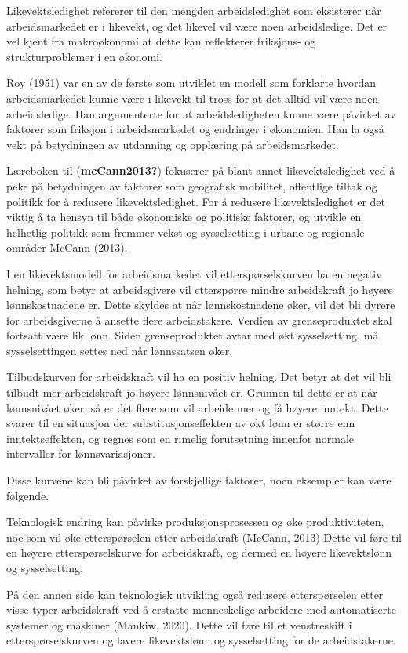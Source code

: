 \documentclass[
]{article}
\begin{document}
Likevektsledighet refererer til den mengden arbeidsledighet som
eksisterer når arbeidsmarkedet er i likevekt, og det likevel vil være
noen arbeidsledige. Det er vel kjent fra makroøkonomi at dette kan
reflekterer friksjons- og strukturproblemer i en økonomi.

Roy (1951) var en av de første som utviklet en modell som forklarte
hvordan arbeidsmarkedet kunne være i likevekt til tross for at det
alltid vil være noen arbeidsledige. Han argumenterte for at
arbeidsledigheten kunne være påvirket av faktorer som friksjon i
arbeidsmarkedet og endringer i økonomien. Han la også vekt på
betydningen av utdanning og opplæring på arbeidsmarkedet.

Læreboken til (\textbf{mcCann2013?}) fokuserer på blant annet
likevektsledighet ved å peke på betydningen av faktorer som geografisk
mobilitet, offentlige tiltak og politikk for å redusere
likevektsledighet. For å redusere likevektsledighet er det viktig å ta
hensyn til både økonomiske og politiske faktorer, og utvikle en
helhetlig politikk som fremmer vekst og sysselsetting i urbane og
regionale områder McCann (2013).

I en likevektsmodell for arbeidsmarkedet vil etterspørselskurven ha en
negativ helning, som betyr at arbeidsgivere vil etterspørre mindre
arbeidskraft jo høyere lønnskostnadene er. Dette skyldes at når
lønnskostnadene øker, vil det bli dyrere for arbeidsgiverne å ansette
flere arbeidstakere. Verdien av grenseproduktet skal fortsatt være lik
lønn. Siden grenseproduktet avtar med økt sysselsetting, må
sysselsettingen settes ned når lønnssatsen øker.

Tilbudskurven for arbeidskraft vil ha en positiv helning. Det betyr at
det vil bli tilbudt mer arbeidskraft jo høyere lønnsnivået er. Grunnen
til dette er at når lønnsnivået øker, så er det flere som vil arbeide
mer og få høyere inntekt. Dette svarer til en situasjon der
substitusjonseffekten av økt lønn er større enn inntektseffekten, og
regnes som en rimelig forutsetning innenfor normale intervaller for
lønnsvariasjoner.

Disse kurvene kan bli påvirket av forskjellige faktorer, noen eksempler
kan være følgende.

Teknologisk endring kan påvirke produksjonsprosessen og øke
produktiviteten, noe som vil øke etterspørselen etter arbeidskraft
(McCann, 2013) Dette vil føre til en høyere etterspørselskurve for
arbeidskraft, og dermed en høyere likevektslønn og sysselsetting.

På den annen side kan teknologisk utvikling også redusere etterspørselen
etter visse typer arbeidskraft ved å erstatte menneskelige arbeidere med
automatiserte systemer og maskiner (Mankiw, 2020). Dette vil føre til et
venstreskift i etterspørselskurven og lavere likevektslønn og
sysselsetting for de arbeidstakerne.
\end{document}

